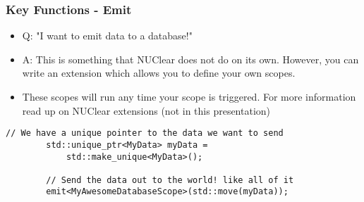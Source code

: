 \documentclass{beamer}
\begin{document}
\begin{frame}[fragile]
	\frametitle{Key Functions - Emit}
	\begin{itemize}
		\item Q: "I want to emit data to a database!"
		\item A: This is something that NUClear does not do on its own. However, you can write an extension which allows you to define your own scopes.
		\item These scopes will run any time your scope is triggered. For more information read up on NUClear extensions (not in this presentation)
	\end{itemize}

	\begin{lstlisting}[language=nuclear]
		// We have a unique pointer to the data we want to send
		std::unique_ptr<MyData> myData =
		    std::make_unique<MyData>();

		// Send the data out to the world! like all of it
		emit<MyAwesomeDatabaseScope>(std::move(myData));
	\end{lstlisting}
\end{frame}
\end{document}
